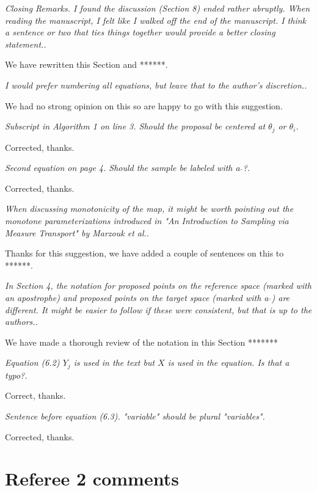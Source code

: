 \documentclass{article}
\newcommand{\comment}[2]{\vspace{0.6cm}{\bf Comment:} {\it #1.}

\vspace{0.3cm}{\bf Answer:} #2}
\begin{document}

\comment{Closing Remarks. I found the discussion (Section 8) ended rather abruptly. When reading the manuscript, I felt like I walked off the end of the manuscript. I think a sentence or two that ties things together would provide a better closing statement.}{We have rewritten this Section and ******.}



\comment{I would prefer numbering all equations, but leave that to the author's discretion.}{We had no strong opinion on this so are happy to go with this suggestion.}


\comment{Subscript in Algorithm 1 on line 3. Should the proposal be centered at $\theta_j$ or $\theta_i$}{Corrected, thanks.}



\comment{Second equation on page 4. Should the sample be labeled with a $\hat{ }$?}{Corrected, thanks.}


\comment{When discussing monotonicity of the map, it might be worth pointing out the monotone parameterizations introduced in "An Introduction to Sampling via Measure Transport" by Marzouk et al.}{Thanks for this suggestion, we have added a couple of sentences on this to ******.}


\comment{In Section 4, the notation for proposed points on the reference space (marked with an apostrophe) and proposed points on the target space (marked with a $\hat{ }$) are different. It might be easier to follow if these were consistent, but that is up to the authors.}{We have made a thorough review of the notation in this Section *******}

\comment{Equation (6.2) $Y_j$ is used in the text but $X$ is used in the equation. Is that a typo?}{Correct, thanks.}


\comment{Sentence before equation (6.3). "variable" should be plural "variables"}{Corrected, thanks.}


\section*{Referee 2 comments}
\end{document}
